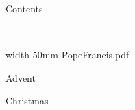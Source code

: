 \eject

\centerline{\bigtype Contents}

\doubleline

\bigskip

\readtocfile

\vfill

\eject

\vfill
\eject


%






\ 

\vfill


\saveimageresource width 50mm {PopeFrancis.pdf}

\centerline{\useimageresource \lastsavedimageresourceindex}




\vfill


%

\eject


\beginpart Advent



\paginaproxima


\bigskip


\paginaproxima

\beginpart Christmas


\paginaproxima


\paginaproxima


